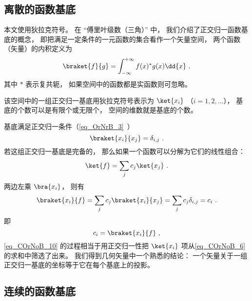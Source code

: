 

\subsection{离散的函数基底}
本文使用狄拉克符号。 在 “傅里叶级数（三角）” 中， 我们介绍了正交归一函数基底的概念， 即把满足一定条件的一元函数的集合看作一个矢量空间， 两个函数（矢量）的内积定义为
\begin{equation}
\braket{f}{g} = \int_{-\infty}^{+\infty} f(x)^* g(x) \dd{x}~.
\end{equation}
其中 $*$ 表示复共轭， 如果空间中的函数都是实函数则可忽略。

该空间中的一组正交归一基底用狄拉克符号表示为 $\ket{x_i}$ （$i = 1, 2,\dots$）， 基底的个数可以是有限个或无限个， 空间的维数就是基底的个数。

基底满足正交归一条件（\autoref{eq_OrNrB_3}~）
\begin{equation}\label{eq_COrNoB_2}
\braket{x_i}{x_j} = \delta_{i,j}~.
\end{equation}
若这组正交归一基底是完备的， 那么如果一个函数可以分解为它们的线性组合：
\begin{equation}\label{eq_COrNoB_6}
\ket{f} = \sum_j c_j\ket{x_j}~.
\end{equation}
两边左乘 $\bra{x_i}$， 则有
\begin{equation}\label{eq_COrNoB_10}
\braket{x_i}{f} = \sum_j c_j\braket{x_i}{x_j} = \sum_j c_j \delta_{i,j} = c_i~.
\end{equation}
即
\begin{equation}\label{eq_COrNoB_5}
c_i = \braket{x_i}{f}~,
\end{equation}
\autoref{eq_COrNoB_10} 的过程相当于用正交归一性把 $\ket{x_i}$ 项从\autoref{eq_COrNoB_6} 的求和中筛选了出来。 我们得到几何矢量中一个熟悉的结论： 一个矢量关于一组正交归一基底的坐标等于它在每个基底上的投影。

\subsection{连续的函数基底}

